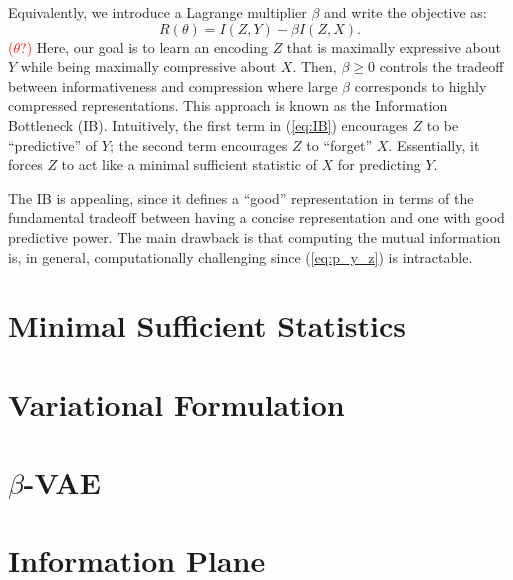 \documentclass[11pt]{article}
\newcommand\myworries[1]{\textcolor{red}{(#1)}}
\begin{document}
Equivalently, we introduce a Lagrange multiplier $\beta$ and write the objective as:
\begin{equation}
R(\theta) = I(Z,Y) - \beta I(Z,X).
\label{eq:IB}
\end{equation}
\myworries{$\theta$?}
Here, our goal is to learn an encoding $Z$ that is maximally expressive about $Y$ while being maximally compressive about $X$. Then, $\beta\geq 0$ controls the tradeoff between informativeness and compression where large $\beta$ corresponds to highly compressed representations. This approach is known as the Information Bottleneck (IB). Intuitively, the first term in (\ref{eq:IB}) encourages $Z$ to be ``predictive'' of $Y$; the second term encourages $Z$ to ``forget'' $X$. Essentially, it forces $Z$ to act like a minimal sufficient statistic of $X$ for predicting $Y$.

The IB is appealing, since it defines a ``good'' representation in terms of the fundamental tradeoff between having a concise representation and one with good predictive power. The main drawback is that computing the mutual information is, in general, computationally challenging since (\ref{eq:p_y_z}) is intractable.

\section{Minimal Sufficient Statistics}

\section{Variational Formulation}


\section{$\beta$-VAE}

\section{Information Plane}


 
\end{document}
